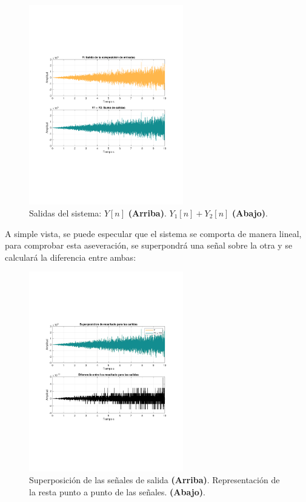 			\begin{figure}[H]
				\center
				\includegraphics[width=0.6\textwidth,clip, trim = {2cm 7.0cm 2.2cm 7.0cm}]{../imgs/sistema_1_linealidad_salidas.pdf}
				\caption{Salidas del sistema: $Y[n]$ \textbf{(Arriba)}. $Y_{1}[n] + Y_{2}[n]$ \textbf{(Abajo)}.}
				\label{fig:s_1_lineality_outputs}
			\end{figure}
			
			A simple vista, se puede especular que el sistema se comporta de manera lineal, para comprobar esta aseveración, se superpondrá una señal sobre la otra y se calculará la diferencia entre ambas:
			\begin{figure}[H]
				\center
				\includegraphics[width=0.6\textwidth,clip, trim = {2cm 7.0cm 2.2cm 7.0cm}]{../imgs/sistema_1_linealidad_superpuestas.pdf}
				\caption{Superposición de las señales de salida \textbf{(Arriba)}. Representación de la resta punto a punto de las señales. \textbf{(Abajo)}.}
				\label{fig:s_1_lineality_superposition}
			\end{figure}
			

